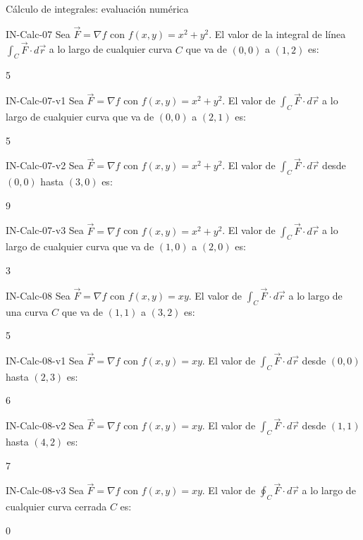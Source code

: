 \documentclass[a4,11pt]{aleph-notas}
\begin{document}
\begin{quiz}{Cálculo de integrales: evaluación numérica}
\begin{numerical}[tolerance=0.01]%
    {IN-Calc-07}
    Sea $\vec{F} = \nabla f$ con $f(x,y) = x^2 + y^2$. El valor de la integral de línea $\displaystyle\int_C \vec{F}\cdot d\vec{r}$ a lo largo de cualquier curva $C$ que va de $(0,0)$ a $(1,2)$ es:
    \item 5
\end{numerical}

\begin{numerical}[tolerance=0.01]%
    {IN-Calc-07-v1}
    Sea $\vec{F} = \nabla f$ con $f(x,y) = x^2 + y^2$. El valor de $\displaystyle\int_C \vec{F}\cdot d\vec{r}$ a lo largo de cualquier curva que va de $(0,0)$ a $(2,1)$ es:
    \item 5
\end{numerical}

\begin{numerical}[tolerance=0.01]%
    {IN-Calc-07-v2}
    Sea $\vec{F} = \nabla f$ con $f(x,y) = x^2 + y^2$. El valor de $\displaystyle\int_C \vec{F}\cdot d\vec{r}$ desde $(0,0)$ hasta $(3,0)$ es:
    \item 9
\end{numerical}

\begin{numerical}[tolerance=0.01]%
    {IN-Calc-07-v3}
    Sea $\vec{F} = \nabla f$ con $f(x,y) = x^2 + y^2$. El valor de $\displaystyle\int_C \vec{F}\cdot d\vec{r}$ a lo largo de cualquier curva que va de $(1,0)$ a $(2,0)$ es:
    \item 3
\end{numerical}

\begin{numerical}[tolerance=0.01]%
    {IN-Calc-08}
    Sea $\vec{F} = \nabla f$ con $f(x,y) = xy$. El valor de $\displaystyle\int_C \vec{F}\cdot d\vec{r}$ a lo largo de una curva $C$ que va de $(1,1)$ a $(3,2)$ es:
    \item 5
\end{numerical}

\begin{numerical}[tolerance=0.01]%
    {IN-Calc-08-v1}
    Sea $\vec{F} = \nabla f$ con $f(x,y) = xy$. El valor de $\displaystyle\int_C \vec{F}\cdot d\vec{r}$ desde $(0,0)$ hasta $(2,3)$ es:
    \item 6
\end{numerical}

\begin{numerical}[tolerance=0.01]%
    {IN-Calc-08-v2}
    Sea $\vec{F} = \nabla f$ con $f(x,y) = xy$. El valor de $\displaystyle\int_C \vec{F}\cdot d\vec{r}$ desde $(1,1)$ hasta $(4,2)$ es:
    \item 7
\end{numerical}

\begin{numerical}[tolerance=0.01]%
    {IN-Calc-08-v3}
    Sea $\vec{F} = \nabla f$ con $f(x,y) = xy$. El valor de $\displaystyle\oint_C \vec{F}\cdot d\vec{r}$ a lo largo de cualquier curva cerrada $C$ es:
    \item 0
\end{numerical}

\end{quiz}
\end{document}
